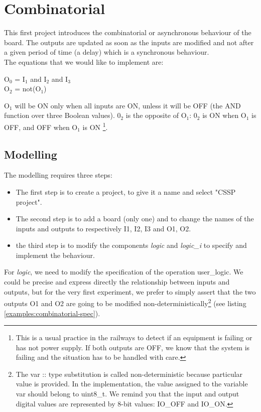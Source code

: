 \chapter{Combinatorial}

This first project introduces the combinatorial or asynchronous behaviour of the board. The outputs are updated as soon as the inputs are modified and not after a given period of time (a delay) which is a synchronous behaviour.\\
The equations that we would like to implement are:
\begin{center}
O$_0$ = I$_1$ and I$_2$ and I$_3$\\
O$_2$ = not(O$_1$)    
\end{center}
O$_1$ will be ON only when all inputs are ON, unless it will be OFF (the AND function over three Boolean values). 0$_2$ is the opposite of O$_1$: 0$_2$ is ON when O$_1$ is OFF, and OFF when O$_1$ is ON \footnote{This is a usual practice in the railways to detect if an equipment is failing or has not power supply. If both outputs are OFF, we know that the system is failing and the situation has to be handled with care.}.

\section{Modelling}

The modelling requires three steps:
\begin{itemize}
    \item The first step is to create a project, to give it a name and select "CSSP project".
    \item The second step is to add a board (only one) and to change the names of the inputs and outputs to respectively I1, I2, I3 and O1, O2.
    \item the third step is to modify the components \textit{logic} and \textit{logic\_i} to specify and implement the behaviour. 
\end{itemize}
 


For \textit{logic}, we need to modify the specification of the operation user\_logic. We could be precise and express directly the relationship between inputs and outputs, but for the very first experiment, we prefer to simply assert that the two outputs O1 and O2 are going to be modified non-deterministically\footnote{The var :: type substitution is called non-deterministic because particular value is provided. In the implementation, the value assigned to the variable var should belong to uint8\_t. We remind you that the input and output digital values are represented by 8-bit values: IO\_OFF and IO\_ON.} (see listing \ref{examples:combinatorial-spec}). 

